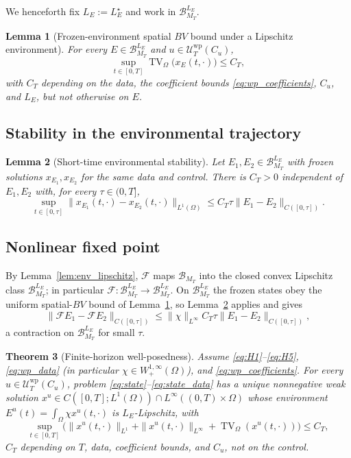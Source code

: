 \documentclass[pdflatex,sn-mathphys-num]{sn-jnl}
\newcommand{\Om}{\Omega}
\DeclareMathOperator{\TV}{TV}
\theoremstyle{plain}
\newtheorem{theorem}{Theorem}[section]
\newtheorem{lemma}[theorem]{Lemma}
\theoremstyle{definition}
\theoremstyle{remark}
\begin{document}
We henceforth fix $L_E:=L_E^\star$ and work in $\mathcal B_{M_T}^{L_E}$.

\begin{lemma}[Frozen-environment spatial $BV$ bound under a Lipschitz environment]
\label{lem:frozen_bv}
For every $E\in\mathcal B_{M_T}^{L_E}$ and $u\in\mathcal U_T^{\mathrm{wp}}(C_u)$,
\begin{equation}\label{eq:frozen_bv_bound}
\sup_{t\in[0,T]}\TV_\Om\big(x_E(t,\cdot)\big)\le C_T,
\end{equation}
with $C_T$ depending on the data, the coefficient bounds \eqref{eq:wp_coefficients},
$C_u$, and $L_E$, but not otherwise on $E$.
\end{lemma}

\subsection{Stability in the environmental trajectory}
\label{subsec:environmental_stability}

\begin{lemma}[Short-time environmental stability]
\label{lem:short_stability}
Let $E_1,E_2\in\mathcal B_{M_T}^{L_E}$ with frozen solutions $x_{E_1},x_{E_2}$ for
the same data and control. There is $C_T>0$ independent of $E_1,E_2$ with, for
every $\tau\in(0,T]$,
\begin{equation}\label{eq:short_stability}
\sup_{t\in[0,\tau]}\|x_{E_1}(t,\cdot)-x_{E_2}(t,\cdot)\|_{L^1(\Om)}
\le C_T\tau\|E_1-E_2\|_{C([0,\tau])}.
\end{equation}
\end{lemma}

\subsection{Nonlinear fixed point}
\label{subsec:nonlinear_fixed_point}

By Lemma~\ref{lem:env_lipschitz}, $\mathcal F$ maps $\mathcal B_{M_T}$ into the
closed convex Lipschitz class $\mathcal B_{M_T}^{L_E}$; in particular
$\mathcal F:\mathcal B_{M_T}^{L_E}\to\mathcal B_{M_T}^{L_E}$. On
$\mathcal B_{M_T}^{L_E}$ the frozen states obey the uniform spatial-$BV$ bound of
Lemma~\ref{lem:frozen_bv}, so Lemma~\ref{lem:short_stability} applies and gives
\[
\|\mathcal FE_1-\mathcal FE_2\|_{C([0,\tau])}
\le\|\chi\|_{L^\infty}C_T\tau\|E_1-E_2\|_{C([0,\tau])},
\]
a contraction on $\mathcal B_{M_T}^{L_E}$ for small $\tau$.

\begin{theorem}[Finite-horizon well-posedness]
\label{thm:wellposed}
Assume \eqref{eq:H1}--\eqref{eq:H5}, \eqref{eq:wp_data} (in particular
$\chi\in W^{1,\infty}_+(\Om)$), and \eqref{eq:wp_coefficients}. For every
$u\in\mathcal U_T^{\mathrm{wp}}(C_u)$, problem
\eqref{eq:state}--\eqref{eq:state_data} has a unique nonnegative weak solution
$x^u\in C([0,T];L^1(\Om))\cap L^\infty((0,T)\times\Om)$ whose environment
$E^u(t)=\int_\Om\chi x^u(t,\cdot)$ is $L_E$-Lipschitz, with
\[
\sup_{t\in[0,T]}
\big(\|x^u(t,\cdot)\|_{L^1}+\|x^u(t,\cdot)\|_{L^\infty}+\TV_\Om(x^u(t,\cdot))\big)
\le C_T,
\]
$C_T$ depending on $T$, data, coefficient bounds, and $C_u$, not on the control.
\end{theorem}
\end{document}
